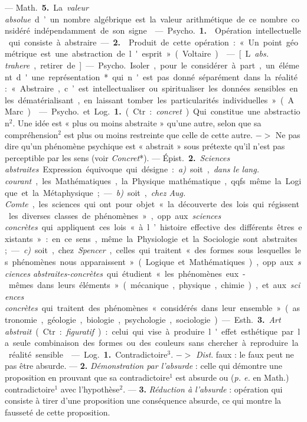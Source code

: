 \begin{itemize}[leftmargin=1cm, label=, itemsep=1pt]
 — \si{Math.} {\bf 5.} La {\it valeur absolue} d’un
nombre algébrique est la valeur
arithmétique de ce nombre considéré
indépendamment de son signe.

 — \si{Psycho.} {\bf 1.}  Opération
intellectuelle qui consiste à
abstraire. — {\bf 2.}  Produit de cette
opération : « Un point géométrique est
une abstraction de l'esprit » (Voltaire).

 — [L. {\it abs. trahere}, retirer de]
— \si{Psycho.} Isoler, pour le considérer
à part, un élément d'une représentation*
qui n'est pas donné séparément
dans la réalité : « Abstraire,
c’est intellectualiser ou spiritualiser
les données sensibles en les dématérialisant,
en laissant tomber les
particularités individuelles » (A.
Marc).

 — \si{Psycho.} et \si{Log.} {\bf 1.} (Ctr. :
{\it concret}). Qui constitue une abstraction$^2$.
Une idée est « plus ou moins
abstraite » qu'une autre, selon que
sa compré\-hension$^2$ est plus ou
moins restreinte que celle de cette
autre. $->$ Ne pas dire qu’un phénomène
psychique est « abstrait »
sous prétexte qu'il n’est pas perceptible
par les sens (voir {\it Concret}*). —
\si{Épist.} {\bf 2.} {\it Sciences abstraites}. Expression
équivoque qui désigne : {\it a)} soit,
{\it dans le lang. courant}, les Mathématiques,
la Physique mathématique,
qqfs. même la Logique et la Métaphysique;
— {\it b)} soit, {\it chez Aug.
Comte}, les sciences qui ont pour
objet « la découverte des lois qui
régissent les diverses classes de phénomènes »,
opp. aux {\it sciences concrètes}
qui appliquent ces lois « à l’histoire
effective des différents êtres existants » :
en ce sens, même la Physiologie
et la Sociologie sont abstraites;
— {\it c)} soit, chez {\it Spencer}, celles qui
traitent « des formes sous lesquelles
les phénomènes nous apparaissent »
(Logique et Mathématiques), opp.
aux {\it sciences abstraites-concrètes} qui
étudient « les phénomènes eux-mêmes
dans leurs éléments » (mécanique,
physique, chimie), et aux
{\it sciences concrètes} qui traitent des
phénomènes « considérés dans leur
ensemble » (astronomie, géologie,
biologie, psychologie, sociologie).

— \si{Esth.} {\bf 3.} {\it Art abstrait} (Ctr : {\it figuratif}) : celui qui vise à produire
l'effet esthétique par la seule combinaison des formes ou des couleurs
sans chercher à reproduire la réalité
sensible.

 — \si{Log.} {\bf 1.} Contradictoire$^3$.
$->$ {\it Dist}. faux : le faux peut ne pas
être absurde. — {\bf 2.} {\it Démonstration
par l'absurde} : celle qui démontre
une proposition en prouvant que sa
contradictoire$^1$ est absurde ou ({\it p. e.}
en Math.) contradictoire$^1$ avec l’hypothèse$^2$. — {\bf 3.} {\it Réduction à l'absurde} :
opération qui consiste à tirer d’une
proposition une conséquence absurde,
ce qui montre la fausseté de cette
proposition.


\end{itemize}
